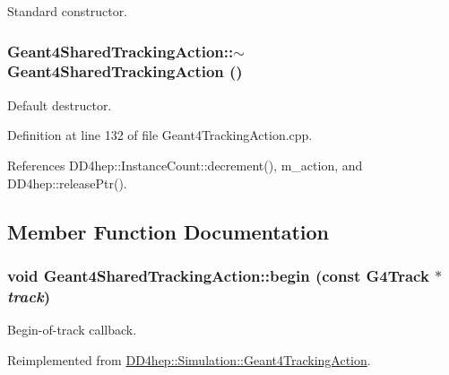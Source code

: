 Standard constructor. \hypertarget{class_d_d4hep_1_1_simulation_1_1_geant4_shared_tracking_action_a067e930e8c51e9363ec6cb2bf7163c68}{
\subsubsection[{$\sim$Geant4SharedTrackingAction}]{\setlength{\rightskip}{0pt plus 5cm}Geant4SharedTrackingAction::$\sim$Geant4SharedTrackingAction ()}}
\label{class_d_d4hep_1_1_simulation_1_1_geant4_shared_tracking_action_a067e930e8c51e9363ec6cb2bf7163c68}


Default destructor. 

Definition at line 132 of file Geant4TrackingAction.cpp.

References DD4hep::InstanceCount::decrement(), m\_\-action, and DD4hep::releasePtr().

\subsection{Member Function Documentation}
\hypertarget{class_d_d4hep_1_1_simulation_1_1_geant4_shared_tracking_action_a67db960b642ca48cc171c0d1296e4125}{
\subsubsection[{begin}]{\setlength{\rightskip}{0pt plus 5cm}void Geant4SharedTrackingAction::begin (const G4Track $\ast$ {\em track})}}
\label{class_d_d4hep_1_1_simulation_1_1_geant4_shared_tracking_action_a67db960b642ca48cc171c0d1296e4125}


Begin-\/of-\/track callback. 

Reimplemented from \hyperlink{class_d_d4hep_1_1_simulation_1_1_geant4_tracking_action_a65858867a7b71bf4f48b9f140bc9a88d}{DD4hep::Simulation::Geant4TrackingAction}.

